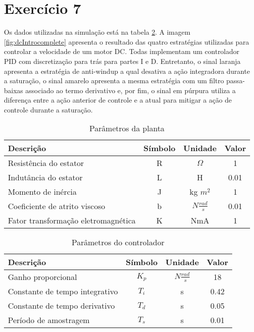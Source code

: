 \section*{Exercício 7}
\label{ex:7}

Os dados utilizadas na simulação está na tabela \ref{tab:ex7}. A imagem \ref{fig:dcIntrocomplete} apresenta o resultado das quatro estratégias utilizadas para controlar a velocidade de um motor DC. Todas implementam um controlador PID com discretização para trás para partes I e D. Entretanto, o sinal laranja apresenta a estratégia de anti-windup a qual desativa a ação integradora durante a saturação, o sinal amarelo apresenta a mesma estratégia com um filtro passa-baixas associado ao termo derivativo e, por fim, o sinal em púrpura utiliza a diferença entre a ação anterior de controle e a atual para mitigar a ação de controle durante a saturação.

\begin{table}[H]
    \centering
    \begin{tabular}{|l|c|c|c|}
    \hline
    Descrição & Símbolo & Unidade & Valor \\ \hline
    Resistência do estator & R & $\Omega$ & 1 \\
    Indutância do estator & L & H & 0.01 \\
    Momento de inércia & J & kg $m^2$  & 1 \\
    Coeficiente de atrito viscoso & b & $N \frac{rad}{s}$ & 0.01 \\
    Fator transformação eletromagnética & K & NmA & 1 \\\hline
    \end{tabular}
    \caption{Parâmetros da planta}
    \label{tab:ex7}
\end{table}

\begin{table}[H]
    \centering
    \begin{tabular}{|l|c|c|c|}
    \hline
    Descrição & Símbolo & Unidade & Valor \\ \hline
    Ganho proporcional & $K_p$ & $N \frac{rad}{s}$ & 18 \\
    Constante de tempo integrativo & $T_i$ & s & 0.42 \\
    Constante de tempo derivativo & $T_d$ & s  & 0.05 \\
    Período de amostragem & $T_s$ & s & 0.01 \\\hline
    \end{tabular}
    \caption{Parâmetros do controlador}
    \label{tab:ex7}
\end{table}


